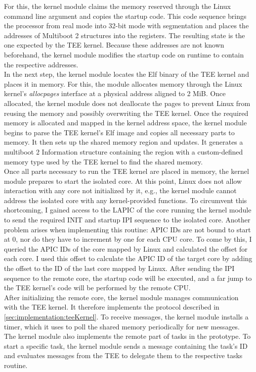 For this, the kernel module claims the memory reserved through the Linux command
line argument and copies the startup code. This code sequence brings the
processor from real mode into 32-bit mode with segmentation and places the
addresses of Multiboot 2 structures into the registers. The resulting state is
the one expected by the TEE kernel. Because these addresses are not known
beforehand, the kernel module modifies the startup code on runtime to contain
the respective addresses.\\

In the next step, the kernel module locates the Elf binary of the TEE kernel and
places it in memory. For this, the module allocates memory through the Linux
kernel's \textit{allocpages} interface at a physical address aligned to 2 MiB.
Once allocated, the kernel module does not deallocate the pages to prevent Linux
from reusing the memory and possibly overwriting the TEE kernel. Once the
required memory is allocated and mapped in the kernel address space, the kernel
module begins to parse the TEE kernel's Elf image and copies all necessary parts
to memory. It then sets up the shared memory region and updates. It generates a
multiboot 2 Information structure containing the region with a custom-defined
memory type used by the TEE kernel to find the shared memory.\\

Once all parts necessary to run the TEE kernel are placed in memory, the kernel
module prepares to start the isolated core. At this point, Linux does not allow
interaction with any core not initialized by it, e.g., the kernel module cannot
address the isolated core with any kernel-provided functions. To circumvent this
shortcoming, I gained access to the LAPIC of the core running the kernel module
to send the required INIT and startup IPI sequence to the isolated core. Another
problem arises when implementing this routine: APIC IDs are not bound to start
at 0, nor do they have to increment by one for each CPU core. To come by this, I
queried the APIC IDs of the core mapped by Linux and calculated the offset for
each core. I used this offset to calculate the APIC ID of the target core by
adding the offset to the ID of the last core mapped by Linux. After sending the
IPI sequence to the remote core, the startup code will be executed, and a far
jump to the TEE kernel's code will be performed by the remote CPU.\\

After initializing the remote core, the kernel module manages communication with
the TEE kernel. It therefore implements the protocol described in
\ref{sec:implementation:teeKernel}. To receive messages, the kernel module
installs a timer, which it uses to poll the shared memory periodically for new
messages. The kernel module also implements the remote part of tasks in the
prototype. To start a specific task, the kernel module sends a message
containing the task's ID and evaluates messages from the TEE to delegate them to
the respective tasks routine. \\

